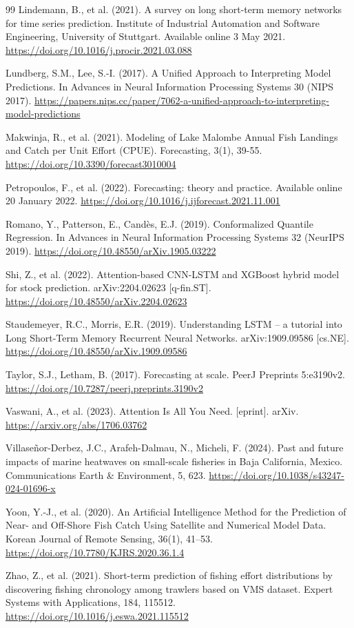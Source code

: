 \documentclass[twoside,11pt]{article}
\begin{document}
\begin{thebibliography}{99}
Lindemann, B., et al. (2021). A survey on long short-term memory networks for time series prediction. Institute of Industrial Automation and Software Engineering, University of Stuttgart. Available online 3 May 2021. \url{https://doi.org/10.1016/j.procir.2021.03.088}

Lundberg, S.M., Lee, S.-I. (2017). A Unified Approach to Interpreting Model Predictions. In Advances in Neural Information Processing Systems 30 (NIPS 2017). \url{https://papers.nips.cc/paper/7062-a-unified-approach-to-interpreting-model-predictions}

Makwinja, R., et al. (2021). Modeling of Lake Malombe Annual Fish Landings and Catch per Unit Effort (CPUE). Forecasting, 3(1), 39-55. \url{https://doi.org/10.3390/forecast3010004}

Petropoulos, F., et al. (2022). Forecasting: theory and practice. Available online 20 January 2022. \url{https://doi.org/10.1016/j.ijforecast.2021.11.001}

Romano, Y., Patterson, E., Candès, E.J. (2019). Conformalized Quantile Regression. In Advances in Neural Information Processing Systems 32 (NeurIPS 2019). \url{https://doi.org/10.48550/arXiv.1905.03222}

Shi, Z., et al. (2022). Attention-based CNN-LSTM and XGBoost hybrid model for stock prediction. arXiv:2204.02623 [q-fin.ST]. \url{https://doi.org/10.48550/arXiv.2204.02623}

Staudemeyer, R.C., Morris, E.R. (2019). Understanding LSTM -- a tutorial into Long Short-Term Memory Recurrent Neural Networks. arXiv:1909.09586 [cs.NE]. \url{https://doi.org/10.48550/arXiv.1909.09586}

Taylor, S.J., Letham, B. (2017). Forecasting at scale. PeerJ Preprints 5:e3190v2. \url{https://doi.org/10.7287/peerj.preprints.3190v2}

Vaswani, A., et al. (2023). Attention Is All You Need. [eprint]. arXiv. \url{https://arxiv.org/abs/1706.03762}

Villaseñor-Derbez, J.C., Arafeh-Dalmau, N., Micheli, F. (2024). Past and future impacts of marine heatwaves on small-scale fisheries in Baja California, Mexico. Communications Earth \& Environment, 5, 623. \url{https://doi.org/10.1038/s43247-024-01696-x}

Yoon, Y.-J., et al. (2020). An Artificial Intelligence Method for the Prediction of Near- and Off-Shore Fish Catch Using Satellite and Numerical Model Data. Korean Journal of Remote Sensing, 36(1), 41–53. \url{https://doi.org/10.7780/KJRS.2020.36.1.4}

Zhao, Z., et al. (2021). Short-term prediction of fishing effort distributions by discovering fishing chronology among trawlers based on VMS dataset. Expert Systems with Applications, 184, 115512. \url{https://doi.org/10.1016/j.eswa.2021.115512}
\end{thebibliography}
\end{document}
